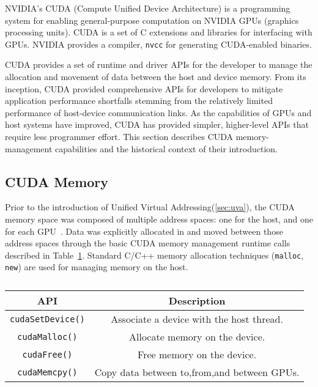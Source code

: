 NVIDIA's CUDA (Compute Unified Device Architecture) is a programming system for enabling general-purpose computation on NVIDIA GPUs (graphics processing units).
CUDA is a set of C extensions and libraries for interfacing with GPUs.
NVIDIA provides a compiler, \texttt{nvcc} for generating CUDA-enabled binaries.

CUDA provides a set of runtime and driver APIs for the developer to manage the allocation and movement of data between the host and device memory.
From its inception, CUDA provided comprehensive APIs for developers to mitigate application performance shortfalls stemming from the relatively limited performance of host-device communication links.
As the capabilities of GPUs and host systems have improved, CUDA has provided simpler, higher-level APIs that require less programmer effort.
This section describes CUDA memory-management capabilities and the historical context of their introduction.


\subsection{CUDA Memory}

Prior to the introduction of Unified Virtual Addressing(\ref{sec:uva}), the CUDA memory space was composed of multiple address spaces: one for the host, and one for each GPU~\cite{schroeder2011peer}.
Data was explicitly allocated in and moved between those address spaces through the basic CUDA memory management runtime calls described in Table~\ref{tab:cuda-basic-apis}.
Standard C/C++ memory allocation techniques (\texttt{malloc}, \texttt{new}) are used for managing memory on the host.

\begin{table}[h]
    \centering
    \caption[Basic CUDA Memory-management APIs]{}
    \label{tab:cuda-basic-apis}
    \begin{tabular}{|c|c|}
    \hline
    \textbf{API}    & \textbf{Description}                                    \\ \hline
    \texttt{cudaSetDevice()} & Associate a device with the host thread. \\ \hline
    \texttt{cudaMalloc()}    & Allocate memory on the device.                 \\ \hline
    \texttt{cudaFree()}      & Free memory on the device.                     \\ \hline
    \texttt{cudaMemcpy()}    & Copy data between to,from,and between GPUs.    \\ \hline
    \end{tabular}
\end{table}

